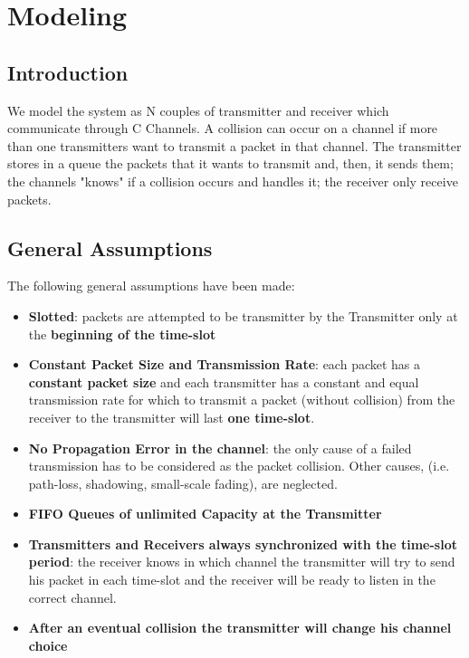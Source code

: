 \section{Modeling}
\subsection{Introduction}
We model the system as N couples of transmitter and receiver which communicate through C Channels. A collision can occur on a channel if more than one transmitters want to transmit a packet in that channel. The transmitter stores in a queue the packets that it wants to transmit and, then, it sends them; the channels "knows" if a collision occurs and handles it; the receiver only receive packets.  
\subsection{General Assumptions}
The following general assumptions have been made:
\begin{itemize}
	\item \textbf{Slotted}: packets are attempted to be transmitter by the Transmitter only at the \textbf{beginning of the time-slot}
	\item \textbf{Constant Packet Size and Transmission Rate}: each packet has a \textbf{constant packet size} and each transmitter has a constant and equal transmission rate for which to transmit a packet (without collision) from the receiver to the transmitter will last \textbf{one time-slot}.
	\item \textbf{No Propagation Error in the channel}: the only cause of a failed transmission has to be considered as the packet collision. Other causes, (i.e. path-loss, shadowing, small-scale fading), are neglected. 
	\item \textbf{FIFO Queues of unlimited Capacity at the Transmitter} 
	\item \textbf{Transmitters and Receivers always synchronized with the time-slot period}: the receiver knows in which channel the transmitter will try to send his packet in each time-slot and the receiver will be ready to listen in the correct channel.
	\item \textbf{After an eventual collision the transmitter will change his channel choice}
\end{itemize}

